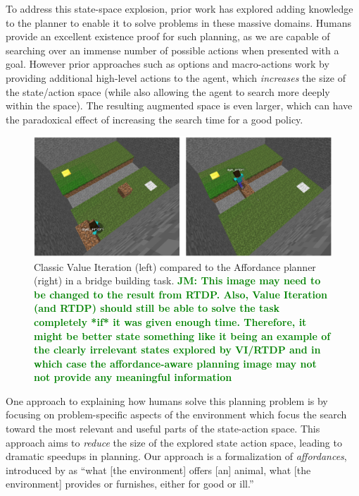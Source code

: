 \documentclass[]{article}
\newcommand{\jmnote}[1]{\textcolor{Green}{\textbf{JM: #1}}}
\begin{document}
To address this state-space explosion, prior work has explored adding
knowledge to the planner to enable it to solve problems in these
massive domains. Humans provide an excellent existence proof for such
planning, as we are capable of searching over an immense number of
possible actions when presented with a goal.  However prior approaches
such as options and macro-actions work by providing additional
high-level actions to the agent, which {\em increases} the size of the
state/action space (while also allowing the agent to search more
deeply within the space).  The resulting augmented space is even
larger, which can have the paradoxical effect of increasing the search time for
a good policy.

\begin{figure}
\centering
\includegraphics[scale =0.18]{figures/bridgeworld_vi_vs_aff.png}
  \caption{Classic Value Iteration (left) compared to the Affordance planner (right) in a bridge building task. \jmnote{This image may need to be changed to the result from RTDP. Also, Value Iteration
  (and RTDP) should still be able to solve the task completely *if* it was given enough time.
  Therefore, it might be better state something like it being an example of the clearly irrelevant states
  explored by VI/RTDP and in which case the affordance-aware planning image may not
  not provide any meaningful information}}
  \label{fig:minecraft}
\end{figure}

One approach to explaining how humans solve this planning problem is
by focusing on problem-specific aspects of the environment which focus
the search toward the most relevant and useful parts of the
state-action space.  This approach aims to {\em reduce}
the size of the explored state action space, leading to dramatic speedups in
planning.  Our approach is a formalization of {\em affordances},
introduced by \citet{gibson77} as ``what [the environment] offers [an]
animal, what [the environment] provides or furnishes, either for good
or ill.''  
\end{document}
